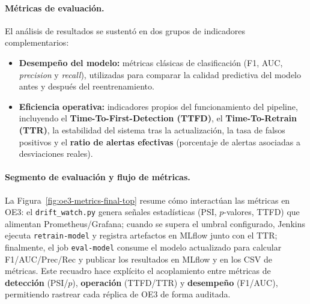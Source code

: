 \paragraph{Métricas de evaluación.}  
El análisis de resultados se sustentó en dos grupos de indicadores complementarios:

\begin{itemize}\setlength\itemsep{2pt}
  \item \textbf{Desempeño del modelo:} métricas clásicas de clasificación (F1, AUC, \textit{precision} y \textit{recall}), utilizadas para comparar la calidad predictiva del modelo antes y después del reentrenamiento.
  \item \textbf{Eficiencia operativa:} indicadores propios del funcionamiento del pipeline, incluyendo el \textbf{Time-To-First-Detection (TTFD)}, el \textbf{Time-To-Retrain (TTR)}, la estabilidad del sistema tras la actualización, la tasa de falsos positivos y el \textbf{ratio de alertas efectivas} (porcentaje de alertas asociadas a desviaciones reales).
\end{itemize}

\paragraph{Segmento de evaluación y flujo de métricas.}
La Figura~\ref{fig:oe3-metrics-final-top} resume cómo interactúan las métricas en OE3: el \texttt{drift\_watch.py} genera señales estadísticas (PSI, $p$-valores, TTFD) que alimentan Prometheus/Grafana; cuando se supera el umbral configurado, Jenkins ejecuta \texttt{retrain-model} y registra artefactos en MLflow junto con el TTR; finalmente, el job \texttt{eval-model} consume el modelo actualizado para calcular F1/AUC/Prec/Rec y publicar los resultados en MLflow y en los CSV de métricas. Este recuadro hace explícito el acoplamiento entre métricas de \textbf{detección} (PSI/$p$), \textbf{operación} (TTFD/TTR) y \textbf{desempeño} (F1/AUC), permitiendo rastrear cada réplica de OE3 de forma auditada.

